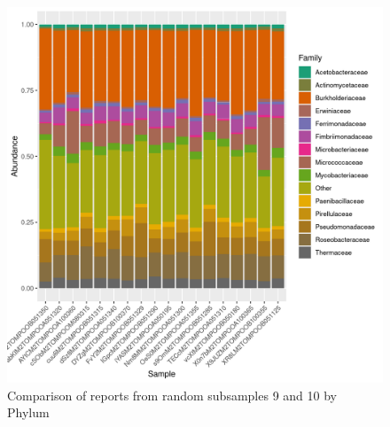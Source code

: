\documentclass{article}
\begin{document}
\begin{figure}
\centering
\includegraphics[scale=0.8]{reporte_tomate1.csv_NA_relative_abundance_Family.png}
\caption{Comparison of reports from random subsamples 9 and 10 by Phylum}
\end{figure}
\end{document}
